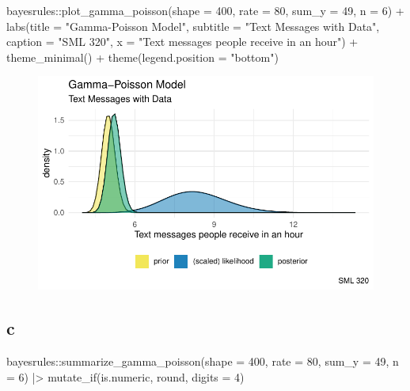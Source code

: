 \documentclass[
  letterpaper,
  DIV=11,
  numbers=noendperiod]{scrartcl}
\newenvironment{Shaded}{\begin{snugshade}}{\end{snugshade}}
\newcommand{\AttributeTok}[1]{\textcolor[rgb]{0.40,0.45,0.13}{#1}}
\newcommand{\DecValTok}[1]{\textcolor[rgb]{0.68,0.00,0.00}{#1}}
\newcommand{\FunctionTok}[1]{\textcolor[rgb]{0.28,0.35,0.67}{#1}}
\newcommand{\NormalTok}[1]{\textcolor[rgb]{0.00,0.23,0.31}{#1}}
\newcommand{\SpecialCharTok}[1]{\textcolor[rgb]{0.37,0.37,0.37}{#1}}
\newcommand{\StringTok}[1]{\textcolor[rgb]{0.13,0.47,0.30}{#1}}
\begin{document}
\begin{Shaded}
\begin{Highlighting}[]
\NormalTok{bayesrules}\SpecialCharTok{::}\FunctionTok{plot\_gamma\_poisson}\NormalTok{(}\AttributeTok{shape =} \DecValTok{400}\NormalTok{, }\AttributeTok{rate =} \DecValTok{80}\NormalTok{,}
                               \AttributeTok{sum\_y =} \DecValTok{49}\NormalTok{, }\AttributeTok{n =} \DecValTok{6}\NormalTok{) }\SpecialCharTok{+}
  \FunctionTok{labs}\NormalTok{(}\AttributeTok{title =} \StringTok{"Gamma{-}Poisson Model"}\NormalTok{,}
       \AttributeTok{subtitle =} \StringTok{"Text Messages with Data"}\NormalTok{,}
       \AttributeTok{caption =} \StringTok{"SML 320"}\NormalTok{,}
       \AttributeTok{x =} \StringTok{"Text messages people receive in an hour"}\NormalTok{) }\SpecialCharTok{+}
  \FunctionTok{theme\_minimal}\NormalTok{() }\SpecialCharTok{+}
  \FunctionTok{theme}\NormalTok{(}\AttributeTok{legend.position =} \StringTok{"bottom"}\NormalTok{)}
\end{Highlighting}
\end{Shaded}

\begin{figure}[H]

{\centering \includegraphics{ps4_code_files/figure-pdf/unnamed-chunk-2-1.pdf}

}

\end{figure}

\hypertarget{c}{%
\subsection{c}\label{c}}

\begin{Shaded}
\begin{Highlighting}[]
\NormalTok{bayesrules}\SpecialCharTok{::}\FunctionTok{summarize\_gamma\_poisson}\NormalTok{(}\AttributeTok{shape =} \DecValTok{400}\NormalTok{, }\AttributeTok{rate =} \DecValTok{80}\NormalTok{,}
                               \AttributeTok{sum\_y =} \DecValTok{49}\NormalTok{, }\AttributeTok{n =} \DecValTok{6}\NormalTok{) }\SpecialCharTok{|\textgreater{}}
  \FunctionTok{mutate\_if}\NormalTok{(is.numeric, round, }\AttributeTok{digits =} \DecValTok{4}\NormalTok{)}
\end{Highlighting}
\end{Shaded}
\end{document}
